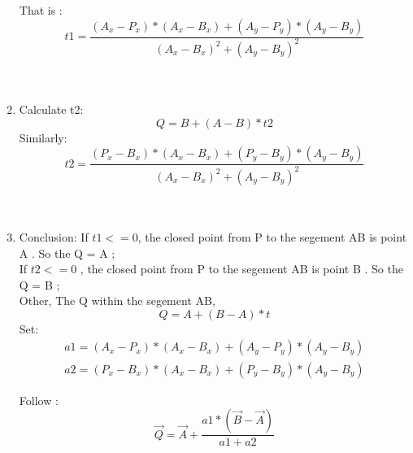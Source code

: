 \documentclass[12pt]{article}
\begin{document}
\begin{enumerate}
		That is :
		\begin{equation}
		t1 = \frac{(A_x-P_x)*(A_x-B_x)+(A_y-P_y) * (A_y-B_y)}{(A_x- B_x)^2+(A_y-B_y)^2}
		\end{equation}\\\\
	\item Calculate t2:
		\begin{equation}
		Q=B+(A-B)*t2
		\end{equation}
		Similarly:
		\begin{equation}
		t2 = \frac{(P_x-B_x)*(A_x-B_x)+(P_y-B_y) * (A_y-B_y)}{(A_x- B_x)^2+(A_y-B_y)^2}
		\end{equation}\\\\
	\item Conclusion:
		If $t1<=0$, the closed point from P to the segement AB is point A . So the Q = A ;\\
		If $t2 <= 0$ , the closed point from P to the segement AB is point B . So the Q = B ;\\
		Other, The Q within the segement AB,
		\begin{equation}
		Q = A + (B-A) * t
		\end{equation}
		Set: 
		\begin{eqnarray}
		a1 = (A_x-P_x)*(A_x-B_x)+(A_y-P_y) * (A_y-B_y)\\
		a2 = (P_x-B_x)*(A_x-B_x)+(P_y-B_y) * (A_y-B_y)
		\end{eqnarray}
		
		Follow : 
		\begin{equation}
		\vec{Q} =\vec{A} +  \frac{a1*(\vec{B} - \vec{A})}{a1 + a2}
		\end{equation}
\end{enumerate}
\end{document}
